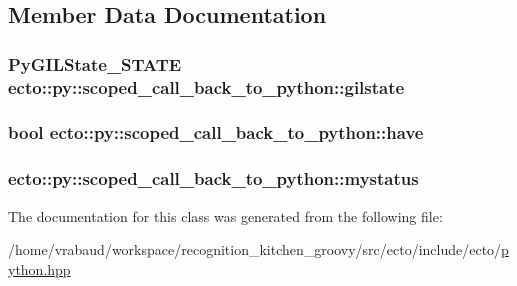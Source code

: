 \subsection{\-Member \-Data \-Documentation}
\hypertarget{classecto_1_1py_1_1scoped__call__back__to__python_a67de9bb9e263a7e77cefe47e75b18512}{
\subsubsection[{gilstate}]{\setlength{\rightskip}{0pt plus 5cm}\-Py\-G\-I\-L\-State\-\_\-\-S\-T\-A\-T\-E {\bf ecto\-::py\-::scoped\-\_\-call\-\_\-back\-\_\-to\-\_\-python\-::gilstate}}}\label{classecto_1_1py_1_1scoped__call__back__to__python_a67de9bb9e263a7e77cefe47e75b18512}
\hypertarget{classecto_1_1py_1_1scoped__call__back__to__python_a4f4d2f01e986f7b93028996a7bd8498f}{
\subsubsection[{have}]{\setlength{\rightskip}{0pt plus 5cm}bool {\bf ecto\-::py\-::scoped\-\_\-call\-\_\-back\-\_\-to\-\_\-python\-::have}}}\label{classecto_1_1py_1_1scoped__call__back__to__python_a4f4d2f01e986f7b93028996a7bd8498f}
\hypertarget{classecto_1_1py_1_1scoped__call__back__to__python_a421a7edb2c8c08321c015312217caad7}{
\subsubsection[{mystatus}]{ {\bf ecto\-::py\-::scoped\-\_\-call\-\_\-back\-\_\-to\-\_\-python\-::mystatus}}}\label{classecto_1_1py_1_1scoped__call__back__to__python_a421a7edb2c8c08321c015312217caad7}


\-The documentation for this class was generated from the following file\-:\begin{DoxyCompactItemize}
\item 
/home/vrabaud/workspace/recognition\-\_\-kitchen\-\_\-groovy/src/ecto/include/ecto/\hyperlink{python_8hpp}{python.\-hpp}\end{DoxyCompactItemize}
